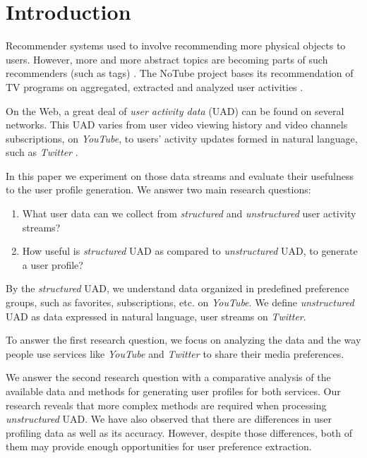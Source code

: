 \section{Introduction}

Recommender systems used to involve recommending more physical objects \cite{combining-cf-with-pa} to users.
However, more and more abstract topics are becoming parts of such recommenders (such as tags) \cite{accuracy-recommending}.
The NoTube project bases its recommendation of TV programs on aggregated, extracted and analyzed user activities
\cite{notube-main}.

On the Web, a great deal of \textit{user activity data} (UAD) can be found on several networks. This UAD varies from user
video viewing history and video channels subscriptions, \eg on \textit{YouTube}, to users' activity updates formed
in natural language, such as \textit{Twitter} \cite{why-we-twitter}.

In this paper we experiment on those data streams and evaluate their usefulness to the user profile generation. We answer
two main research questions:
\begin{enumerate}
  \item What user data can we collect from \textit{structured} and \textit{unstructured} user activity streams?
  \item How useful is \textit{structured} UAD as compared to \textit{unstructured} UAD, to generate a user profile?
\end{enumerate}

By the \textit{structured} UAD, we understand data organized in predefined
preference groups, such as favorites, subscriptions, etc. on \textit{YouTube}.
We define \textit{unstructured} UAD as data expressed in natural language, \eg user streams on \textit{Twitter}.

To answer the first research question, we focus on analyzing the
data and the way people use services like \textit{YouTube} and \textit{Twitter} to share
their media preferences.

We answer the second research question with a comparative analysis of the available data and
methods for generating user profiles for both services.
Our research reveals that more complex methods are required when processing \textit{unstructured} UAD.
We have also observed that there are differences in user profiling data as well as its
accuracy. However, despite those differences, both of them may provide
enough opportunities for user preference extraction.

